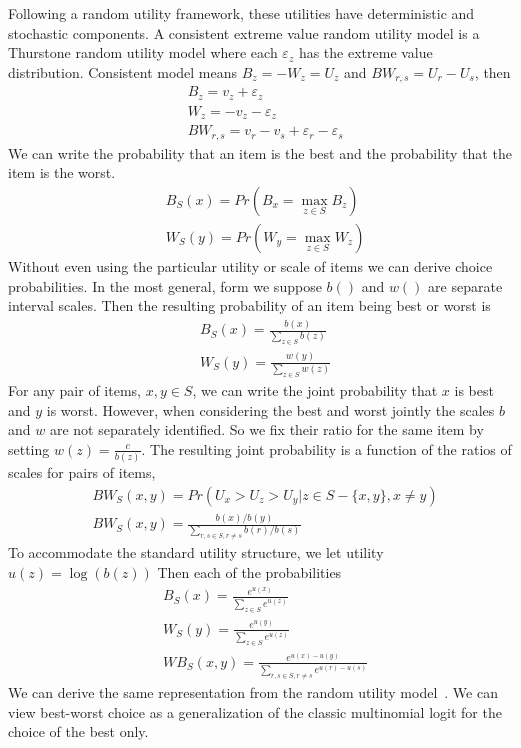 \documentclass[a4paper,12pt]{article}
\begin{document}
Following a random utility framework, these utilities have deterministic and stochastic components. A consistent extreme value random utility model is a Thurstone random utility model where each $\varepsilon_z$ has the extreme value distribution. Consistent model means $B_z=-W_z=U_z$ and $BW_{r,s}=U_r-U_s$, then
\begin{align*}
&B_z=v_z+\varepsilon_z\\
&W_z=-v_z-\varepsilon_z\\
&BW_{r,s}=v_r-v_s+\varepsilon_r-\varepsilon_s
\end{align*}
We can write the probability that an item is the best and the probability that the item is the worst.
\begin{align*}
&B_S (x)= Pr⁡( B_x=\max_{z \in S} B_z)\\
&W_S (y)= Pr⁡( W_y=\max_{z \in S} W_z)
\end{align*}
Without even using the particular utility or scale of items we can derive choice probabilities. In the most general, form we suppose $b()$ and $w()$ are separate interval scales. Then the resulting probability of an item being best or worst is
\begin{align*}
&B_S (x)= \frac{b(x)}{\sum_{z \in S}b(z)}\\
&W_S (y)= \frac{w(y)}{\sum_{z \in S}w(z)}
\end{align*}
For any pair of items, $x,y \in S$, we can write the joint probability that $x$ is best and $y$ is worst. However, when considering the best and worst jointly the scales $b$ and $w$ are not separately identified. So we fix their ratio for the same item by setting $w(z)=\frac{c}{b(z)}$. The resulting joint probability is a function of the ratios of scales for pairs of items, 
\begin{align*}
&BW_S(x,y)=Pr(U_x>U_z>U_y | z \in S -\{x,y\}, x\neq y)\\
&BW_S(x,y)=\frac{b(x)/b(y)}{\sum_{r,s \in S, r \neq s}b(r)/b(s)}
\end{align*}
To accommodate the standard utility structure, we let utility $u(z)=\log{(b(z))}$ Then each of the probabilities 
\begin{align*}
&B_S(x)=\frac{e^{u(x)}}{\sum_{z \in S} e^{u(z)}}\\
&W_S(y)=\frac{e^{u(y)}}{\sum_{z \in S} e^{u(z)}}\\
&WB_S(x,y)=\frac{e^{u(x)-u(y)}}{\sum_{r,s \in S, r\neq s} e^{u(r)-u(s)}}
\end{align*}
We can derive the same representation from the random utility model~\cite{marley2005some}. We can view best-worst choice as a generalization of the classic multinomial logit for the choice of the best only.
\end{document}
